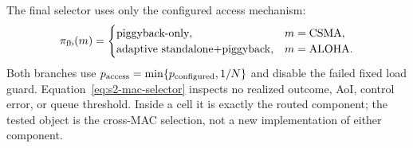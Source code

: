 The final selector uses only the configured access mechanism:
\begin{equation}
\pi_{\rm fb}(m)=
\begin{cases}
\text{piggyback-only}, & m=\text{CSMA},\\
\text{adaptive standalone+piggyback}, & m=\text{ALOHA}.
\end{cases}
\label{eq:s2-mac-selector}
\end{equation}
Both branches use $p_{\rm access}=\min\{p_{\rm configured},1/N\}$ and disable
the failed fixed load guard. Equation~\eqref{eq:s2-mac-selector} inspects no
realized outcome, AoI, control error, or queue threshold. Inside a cell it is
exactly the routed component; the tested object is the cross-MAC selection,
not a new implementation of either component.
